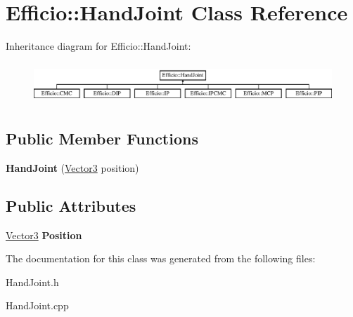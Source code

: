 \hypertarget{class_efficio_1_1_hand_joint}{}\section{Efficio\+:\+:Hand\+Joint Class Reference}
\label{class_efficio_1_1_hand_joint}
Inheritance diagram for Efficio\+:\+:Hand\+Joint\+:\begin{figure}[H]
\begin{center}
\leavevmode
\includegraphics[height=1.568627cm]{class_efficio_1_1_hand_joint}
\end{center}
\end{figure}
\subsection*{Public Member Functions}
\begin{DoxyCompactItemize}
\item 
{\bfseries Hand\+Joint} (\hyperlink{class_efficio_1_1_vector3}{Vector3} position)\hypertarget{class_efficio_1_1_hand_joint_a29681e05e25bc27a4c36c91476529305}{}\label{class_efficio_1_1_hand_joint_a29681e05e25bc27a4c36c91476529305}

\end{DoxyCompactItemize}
\subsection*{Public Attributes}
\begin{DoxyCompactItemize}
\item 
\hyperlink{class_efficio_1_1_vector3}{Vector3} {\bfseries Position}\hypertarget{class_efficio_1_1_hand_joint_a326570c8804140f4427c959c169a8e9c}{}\label{class_efficio_1_1_hand_joint_a326570c8804140f4427c959c169a8e9c}

\end{DoxyCompactItemize}


The documentation for this class was generated from the following files\+:\begin{DoxyCompactItemize}
\item 
Hand\+Joint.\+h\item 
Hand\+Joint.\+cpp\end{DoxyCompactItemize}
